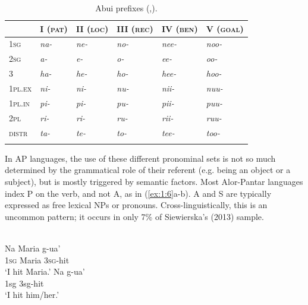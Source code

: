 {\begin{table}\centering 
\begin{tabular}{llllll}
\mytoprule
 & {\scshape I (pat)} & {\scshape II (loc)} & {\scshape III (rec)} & {\scshape IV (ben)} & {\scshape V (goal)}\\
\midrule 
1\textsc{sg} & {\itshape na-} & {\itshape ne-} & {\itshape no-} & {\itshape nee-} & {\itshape noo-}\\
2\textsc{sg} & {\itshape a-} & {\itshape e-} & {\itshape o-} & {\itshape ee-} & {\itshape oo-}\\
3 & {\itshape ha-} & {\itshape he-} & {\itshape ho-} & {\itshape hee-} & {\itshape hoo-}\\
{\scshape 1pl.ex} & {\itshape ni-} & {\itshape ni-} & {\itshape nu-} & {\itshape nii-} & {\itshape nuu-}\\
{\scshape 1pl.in} & {\itshape pi-} & {\itshape pi-} & {\itshape pu-} & {\itshape pii-} & {\itshape puu-}\\
{\scshape 2pl} & {\itshape ri-} & {\itshape ri-} & {\itshape ru-} & {\itshape rii-} & {\itshape ruu-}\\
{\scshape distr} & {\itshape ta-} & {\itshape te-} & {\itshape to-} & {\itshape tee-} & {\itshape too-}\\
\mybottomrule
\end{tabular}

\caption{Abui prefixes (\citealt[78]{Kratochvil2007},\citealt[591]{Kratochvil2011transitivity}).}
\label{tab:1:6}
\end{table}

In AP languages, the use of these different pronominal sets is not so much determined by the grammatical role of their referent (e.g. being an object or a subject), but is mostly triggered by semantic factors. Most Alor-Pantar languages index P on the verb, and not A, as in (\ref{ex:1:6}a-b). A and S are typically expressed as free lexical NPs or pronouns. Cross-linguistically, this is an uncommon pattern; it occurs in only 7\% of Siewierska's (2013) sample.\nocite{Siewierska2013}



\ea%
\label{ex:1:6}
\\
\ea
\gll Na  Maria  g-ua' \\
 1\textsc{sg} Maria  \textsc{3sg-}hit     \\
\glt  `I hit Maria.'
\ex
\gll Na  g-ua' \\
 1sg  3sg-hit    \\
\glt  `I hit him/her.'
\z
\z
 


}
